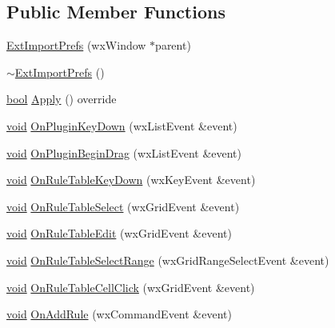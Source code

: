 \subsection*{Public Member Functions}
\begin{DoxyCompactItemize}
\item 
\hyperlink{class_ext_import_prefs_a8f62ead4addbdc9010aa27b375b339eb}{Ext\+Import\+Prefs} (wx\+Window $\ast$parent)
\item 
\hyperlink{class_ext_import_prefs_a3c74d0073e7894f7e7cd3029e6654b4a}{$\sim$\+Ext\+Import\+Prefs} ()
\item 
\hyperlink{mac_2config_2i386_2lib-src_2libsoxr_2soxr-config_8h_abb452686968e48b67397da5f97445f5b}{bool} \hyperlink{class_ext_import_prefs_a4e29d7d07e2d3ab793fca735b0cdae46}{Apply} () override
\item 
\hyperlink{sound_8c_ae35f5844602719cf66324f4de2a658b3}{void} \hyperlink{class_ext_import_prefs_aa803c071d6030a88d84a1c52532b2109}{On\+Plugin\+Key\+Down} (wx\+List\+Event \&event)
\item 
\hyperlink{sound_8c_ae35f5844602719cf66324f4de2a658b3}{void} \hyperlink{class_ext_import_prefs_aaad18cde4e98a61017ef69eafa5ea40c}{On\+Plugin\+Begin\+Drag} (wx\+List\+Event \&event)
\item 
\hyperlink{sound_8c_ae35f5844602719cf66324f4de2a658b3}{void} \hyperlink{class_ext_import_prefs_a991fcb62f8f8d0f95c1e73cbb603ece3}{On\+Rule\+Table\+Key\+Down} (wx\+Key\+Event \&event)
\item 
\hyperlink{sound_8c_ae35f5844602719cf66324f4de2a658b3}{void} \hyperlink{class_ext_import_prefs_a7a901289d621f212183c85c7bc324a87}{On\+Rule\+Table\+Select} (wx\+Grid\+Event \&event)
\item 
\hyperlink{sound_8c_ae35f5844602719cf66324f4de2a658b3}{void} \hyperlink{class_ext_import_prefs_acb88f9e115854caa5d13aae18d1b540d}{On\+Rule\+Table\+Edit} (wx\+Grid\+Event \&event)
\item 
\hyperlink{sound_8c_ae35f5844602719cf66324f4de2a658b3}{void} \hyperlink{class_ext_import_prefs_ada93c4a225b0f213f690b46636da155a}{On\+Rule\+Table\+Select\+Range} (wx\+Grid\+Range\+Select\+Event \&event)
\item 
\hyperlink{sound_8c_ae35f5844602719cf66324f4de2a658b3}{void} \hyperlink{class_ext_import_prefs_a3e1e7876bb2c0d83c0895d75de1c96fb}{On\+Rule\+Table\+Cell\+Click} (wx\+Grid\+Event \&event)
\item 
\hyperlink{sound_8c_ae35f5844602719cf66324f4de2a658b3}{void} \hyperlink{class_ext_import_prefs_a29e0f184cda1dee3ff87c640ce7b8755}{On\+Add\+Rule} (wx\+Command\+Event \&event)

\end{DoxyCompactItemize}
